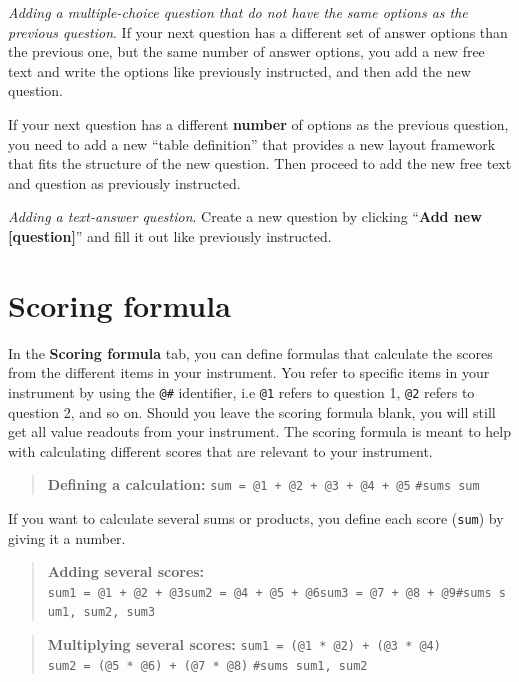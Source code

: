 \documentclass[]{book}
\begin{document}
\emph{Adding a multiple-choice question that do not have the same options as the previous question}.
If your next question has a different set of answer options than the previous one, but the same number of answer options, you add a new free text and write the options like previously instructed, and then add the new question.

If your next question has a different \textbf{number} of options as the previous question, you need to add a new ``table definition'' that provides a new layout framework that fits the structure of the new question. Then proceed to add the new free text and question as previously instructed.

\emph{Adding a text-answer question}.
Create a new question by clicking ``\textbf{Add new {[}question{]}}'' and fill it out like previously instructed.

\hypertarget{scoring-formula}{%
\section{Scoring formula}\label{scoring-formula}}

In the \textbf{Scoring formula} tab, you can define formulas that calculate the scores from the different items in your instrument. You refer to specific items in your instrument by using the \texttt{@\#} identifier, i.e \texttt{@1} refers to question 1, \texttt{@2} refers to question 2, and so on.
Should you leave the scoring formula blank, you will still get all value readouts from your instrument. The scoring formula is meant to help with calculating different scores that are relevant to your instrument.

\begin{quote}
\textbf{Defining a calculation:} \texttt{sum\ =\ @1\ +\ @2\ +\ @3\ +\ @4\ +\ @5}
\texttt{\#sums\ sum}
\end{quote}

If you want to calculate several sums or products, you define each score (\texttt{sum}) by giving it a number.

\begin{quote}
\textbf{Adding several scores:} \texttt{sum1\ =\ @1\ +\ @2\ +\ @3}\texttt{sum2\ =\ @4\ +\ @5\ +\ @6}\texttt{sum3\ =\ @7\ +\ @8\ +\ @9}\texttt{\#sums\ sum1,\ sum2,\ sum3}
\end{quote}

\begin{quote}
\textbf{Multiplying several scores:} \texttt{sum1\ =\ (@1\ *\ @2)\ +\ (@3\ *\ @4)} \texttt{sum2\ =\ (@5\ *\ @6)\ +\ (@7\ *\ @8)} \texttt{\#sums\ sum1,\ sum2}
\end{quote}
\end{document}
